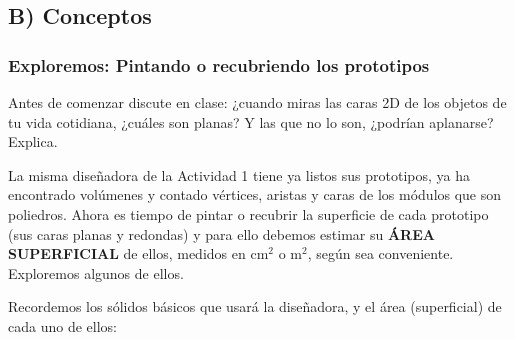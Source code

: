 \documentclass[12pt,a4paper]{article}
\begin{document}

\subsection*{B) Conceptos}

\subsubsection*{Exploremos: Pintando o recubriendo los prototipos}

\begin{tcolorbox}[colback=fondoverde, colframe=verdeclaro]
Antes de comenzar discute en clase: ¿cuando miras las caras 2D de los objetos de tu vida cotidiana, ¿cuáles son planas? Y las que no lo son, ¿podrían aplanarse? Explica.
\end{tcolorbox}

La misma diseñadora de la Actividad 1 tiene ya listos sus prototipos, ya ha encontrado volúmenes y contado vértices, aristas y caras de los módulos que son poliedros. Ahora es tiempo de pintar o recubrir la superficie de cada prototipo (sus caras planas y redondas) y para ello debemos estimar su \textbf{ÁREA SUPERFICIAL} de ellos, medidos en cm$^2$ o m$^2$, según sea conveniente. Exploremos algunos de ellos.

Recordemos los sólidos básicos que usará la diseñadora, y el área (superficial) de cada uno de ellos:
\end{document}
